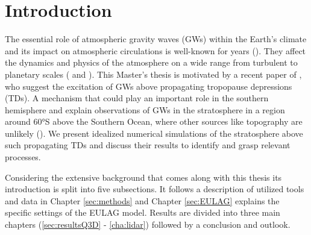 \chapter{Introduction}
\label{sec:intro} 

The essential role of atmospheric gravity waves (GWs) within the Earth's climate and its impact on atmospheric circulations is well-known for years (\cite{fritts_gravity_2003}). They affect the dynamics and physics of the atmosphere on a wide range from turbulent to planetary scales (\cite{plougonven_how_2020} and \cite{williams_census_2017}). This Master's thesis is motivated by a recent paper of \textcite{dornbrack_stratospheric_2022}, who suggest the excitation of GWs above propagating tropopause depressions (TDs). A mechanism that could play an important role in the southern hemisphere and explain observations of GWs in the stratosphere in a region around 60°S above the Southern Ocean, where other sources like topography are unlikely (\cite{hindley_18year_2020}). We present idealized numerical simulations of the stratosphere above such propagating TDs and discuss their results to identify and grasp relevant processes. 

Considering the extensive background that comes along with this thesis its introduction is split into five subsections. It follows a description of utilized tools and data in Chapter \ref{sec:methods} and Chapter \ref{sec:EULAG} explains the specific settings of the EULAG model. Results are divided into three main chapters (\ref{sec:resultsQ3D} - \ref{cha:lidar}) followed by a conclusion and outlook.

%


